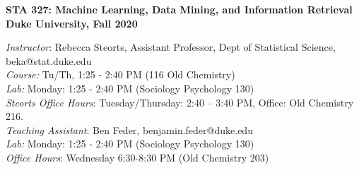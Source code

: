 \documentclass[11pt]{article}
\date{}
\begin{document}

\begin{center}
{\Large\bf STA 327: Machine Learning, Data Mining, and Information Retrieval} \\

{\Large\bf Duke University, Fall 2020} \\
\end{center}



\emph{Instructor}: Rebecca Steorts,  Assistant Professor, Dept of Statistical Science, beka@stat.duke.edu\\
\emph{Course:} Tu/Th, 1:25 - 2:40 PM (116 Old Chemistry)\\
\emph{Lab:} Monday: 1:25 - 2:40 PM (Sociology Psychology 130) \\
\emph{Steorts Office Hours}: Tuesday/Thursday: 2:40 -- 3:40 PM, Office: Old Chemistry 216.\\

\emph{Teaching Assistant}: Ben Feder, benjamin.feder@duke.edu\\
\emph{Lab:} Monday: 1:25 - 2:40 PM (Sociology Psychology 130) \\
\emph{Office Hours}: Wednesday 6:30-8:30 PM (Old Chemistry  203) \\

%

\end{document}
